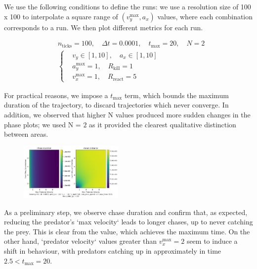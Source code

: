 \documentclass[10pt, twocolumn]{article}
\begin{document}
        We use the following conditions to define the runs: we use a resolution size of 100 x 100 to interpolate a square range of $(v^\text{max}_y, a_x)$ values, where each combination corresponds to a run. We then plot different metrics for each run.

        {\small
        \[
          \begin{aligned}
            &n_{\text{ticks}} = 100, \quad \Delta t = 0.0001,\quad t_{\text{max}} = 20,\quad N = 2 \\
            &\left\{
              \begin{aligned}
                &v_y \in [1, 10],\quad a_x \in [1, 10] \\
                &a^{\text{max}}_y = 1,\quad R_{\text{kill}} = 1 \\
                &v^{\text{max}}_x = 1,\quad R_{\text{react}} = 5
              \end{aligned}
              \right.
            \end{aligned}
          \]
          }

          For practical reasons, we impose a $t_{\text{max}}$ term, which bounds the maximum duration of the trajectory, to discard trajectories which never converge. In addition, we observed that higher $\text{N}$ values produced more sudden changes in the phase plots; we used $\text{N = 2}$ as it provided the clearest qualitative distinction between areas.

          \begin{figure}[H]
            \centering
            \includegraphics[width=0.45\textwidth]{figures/phase_duration_distance.png}
            \label{fig:phaseplot1}
          \end{figure}

          As a preliminary step, we observe chase duration and confirm that, as expected, reducing the predator's `max velocity` leads to longer chases, up to never catching the prey. This is clear from the value, which achieves the maximum time. On the other hand, `predator velocity` values greater than $v_x^{\text{max}}=2$ seem to induce a shift in behaviour, with predators catching up in approximately in time $2.5 < t_{\text{max}} = 20$.
\end{document}
